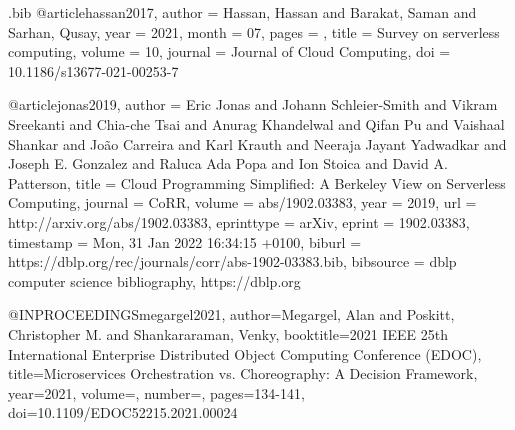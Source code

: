 \begin{filecontents}{\jobname.bib}
@article{hassan2017,
author = {Hassan, Hassan and Barakat, Saman and Sarhan, Qusay},
year = {2021},
month = {07},
pages = {},
title = {Survey on serverless computing},
volume = {10},
journal = {Journal of Cloud Computing},
doi = {10.1186/s13677-021-00253-7}
}

@article{jonas2019,
  author    = {Eric Jonas and
               Johann Schleier{-}Smith and
               Vikram Sreekanti and
               Chia{-}che Tsai and
               Anurag Khandelwal and
               Qifan Pu and
               Vaishaal Shankar and
               Jo{\~{a}}o Carreira and
               Karl Krauth and
               Neeraja Jayant Yadwadkar and
               Joseph E. Gonzalez and
               Raluca Ada Popa and
               Ion Stoica and
               David A. Patterson},
  title     = {Cloud Programming Simplified: {A} Berkeley View on Serverless Computing},
  journal   = {CoRR},
  volume    = {abs/1902.03383},
  year      = {2019},
  url       = {http://arxiv.org/abs/1902.03383},
  eprinttype = {arXiv},
  eprint    = {1902.03383},
  timestamp = {Mon, 31 Jan 2022 16:34:15 +0100},
  biburl    = {https://dblp.org/rec/journals/corr/abs-1902-03383.bib},
  bibsource = {dblp computer science bibliography, https://dblp.org}
}

@INPROCEEDINGS{megargel2021,  author={Megargel, Alan and Poskitt, Christopher M. and Shankararaman, Venky},  booktitle={2021 IEEE 25th International Enterprise Distributed Object Computing Conference (EDOC)},   title={Microservices Orchestration vs. Choreography: A Decision Framework},   year={2021},  volume={},  number={},  pages={134-141},  doi={10.1109/EDOC52215.2021.00024}}
\end{filecontents}
\documentclass[a4paper,12pt]{report}
\usepackage[a4paper,inner = 0.5cm, outer = 0.5cm, top = 2cm, bottom = 2cm]{geometry}
\usepackage{filecontents}
\usepackage[english,romanian]{babel}
\usepackage{blindtext}
\usepackage{fancyhdr}
\usepackage{wrapfig}
\usepackage{graphicx}
\usepackage{amsmath}
\usepackage{caption}
\usepackage{dirtytalk}
\usepackage{url}
\usepackage{listings}
\lstset{
basicstyle=\small\ttfamily,
columns=flexible,
breaklines=true
}
\usepackage{fancyvrb}

\renewenvironment{abstract}[1]
  {\bigskip\selectlanguage{#1}%
   \begin{center}\bfseries\abstractname\end{center}}
  {\par\bigskip}

\newcommand{\source}[1]{\caption*{Sursă: {#1}} }

